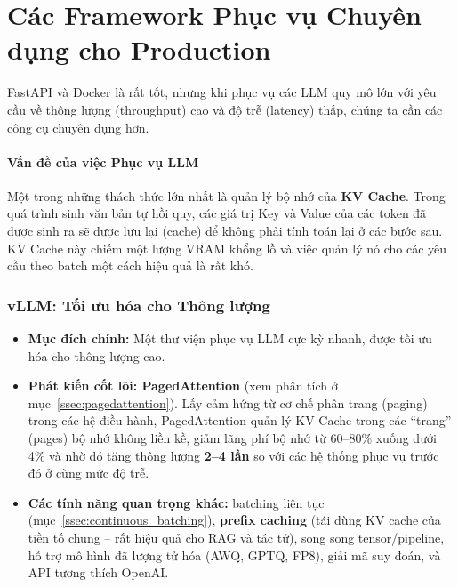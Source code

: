 
\section{Các Framework Phục vụ Chuyên dụng cho Production}
\label{sec:specialized_serving_frameworks}
FastAPI và Docker là rất tốt, nhưng khi phục vụ các LLM quy mô lớn với yêu cầu về thông lượng (throughput) cao và độ trễ (latency) thấp, chúng ta cần các công cụ chuyên dụng hơn.

\paragraph{Vấn đề của việc Phục vụ LLM}
Một trong những thách thức lớn nhất là quản lý bộ nhớ của \textbf{KV Cache}. Trong quá trình sinh văn bản tự hồi quy, các giá trị Key và Value của các token đã được sinh ra sẽ được lưu lại (cache) để không phải tính toán lại ở các bước sau. KV Cache này chiếm một lượng VRAM khổng lồ và việc quản lý nó cho các yêu cầu theo batch một cách hiệu quả là rất khó.

\subsubsection{vLLM: Tối ưu hóa cho Thông lượng}
\begin{itemize}
    \item \textbf{Mục đích chính:} Một thư viện phục vụ LLM cực kỳ nhanh, được tối ưu hóa cho thông lượng cao.
    \item \textbf{Phát kiến cốt lõi: PagedAttention} (xem phân tích ở mục~\ref{ssec:pagedattention}). Lấy cảm hứng từ cơ chế phân trang (paging) trong các hệ điều hành, PagedAttention quản lý KV Cache trong các “trang” (pages) bộ nhớ không liền kề, giảm lãng phí bộ nhớ từ 60--80\% xuống dưới 4\% và nhờ đó tăng thông lượng \textbf{2--4 lần} so với các hệ thống phục vụ trước đó ở cùng mức độ trễ.
    \item \textbf{Các tính năng quan trọng khác:} batching liên tục (mục~\ref{ssec:continuous_batching}), \textbf{prefix caching} (tái dùng KV cache của tiền tố chung -- rất hiệu quả cho RAG và tác tử), song song tensor/pipeline, hỗ trợ mô hình đã lượng tử hóa (AWQ, GPTQ, FP8), giải mã suy đoán, và API tương thích OpenAI.
\end{itemize}

